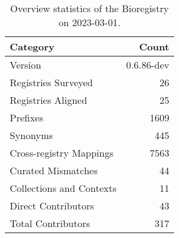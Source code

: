 \begin{table}
\centering
\caption{Overview statistics of the Bioregistry on 2023-03-01.}
\label{tab:bioregistry-summary}
\begin{tabular}{lr}
\toprule
                Category &      Count \\
\midrule
                 Version & 0.6.86-dev \\
     Registries Surveyed &         26 \\
      Registries Aligned &         25 \\
                Prefixes &       1609 \\
                Synonyms &        445 \\
 Cross-registry Mappings &       7563 \\
      Curated Mismatches &         44 \\
Collections and Contexts &         11 \\
     Direct Contributors &         43 \\
      Total Contributors &        317 \\
\bottomrule
\end{tabular}
\end{table}
